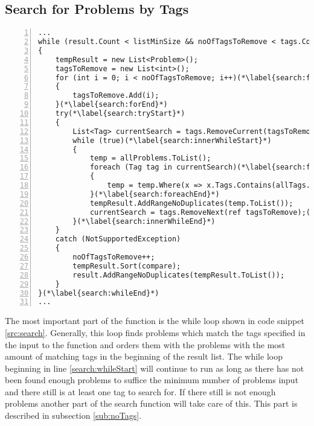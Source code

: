 \subsection{Search for Problems by Tags}
\label{sub:searchTags}
\begin{lstlisting}[style=sourceCode, caption=\myCaption{The while loop which finds and sorts problems matching the input tags}, label=src:search, numbers=left, numberstyle=\footnotesize]
...
while (result.Count < listMinSize && noOfTagsToRemove < tags.Count)(*\label{search:whileStart}*)
{
	tempResult = new List<Problem>();
	tagsToRemove = new List<int>();
	for (int i = 0; i < noOfTagsToRemove; i++)(*\label{search:forStart}*)
	{
		tagsToRemove.Add(i);
	}(*\label{search:forEnd}*)
	try(*\label{search:tryStart}*)
	{
		List<Tag> currentSearch = tags.RemoveCurrent(tagsToRemove);
		while (true)(*\label{search:innerWhileStart}*)
		{
			temp = allProblems.ToList();
			foreach (Tag tag in currentSearch)(*\label{search:foreachStart}*)
			{
				temp = temp.Where(x => x.Tags.Contains(allTags.FirstOrDefault(y => y.Id == tag.Id))).ToList();
			}(*\label{search:foreachEnd}*)
			tempResult.AddRangeNoDuplicates(temp.ToList());
			currentSearch = tags.RemoveNext(ref tagsToRemove);(*\label{search:removeNext}*)
		}(*\label{search:innerWhileEnd}*)
	}
	catch (NotSupportedException)
	{
		noOfTagsToRemove++;
		tempResult.Sort(compare);
		result.AddRangeNoDuplicates(tempResult.ToList());
	}
}(*\label{search:whileEnd}*)
...
\end{lstlisting}

The most important part of the  function is the while loop shown in code snippet \ref{src:search}.
Generally, this loop finds problems which match the tags specified in the input to the function and orders them with the problems with the most amount of matching tags in the beginning of the result list.
The while loop beginning in line \ref{search:whileStart} will continue to run as long as there has not been found enough problems to suffice the minimum number of problems input and there still is at least one tag to search for.
If there still is not enough problems another part of the search function will take care of this.
This part is described in subsection \ref{sub:noTags}.

